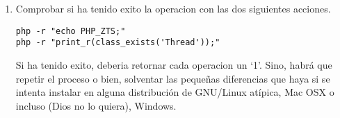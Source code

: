 \documentclass{article}
\begin{document}
\begin{enumerate}
    \item Comprobar si ha tenido exito la operacion con las dos siguientes acciones.
    \begin{lstlisting}[frame=single]
php -r "echo PHP_ZTS;"
php -r "print_r(class_exists('Thread'));"
    \end{lstlisting}
    Si ha tenido exito, deberia retornar cada operacion un `1'. Sino,
    habrá que repetir el proceso o bien, solventar las pequeñas diferencias
    que haya si se intenta instalar en alguna distribución de GNU/Linux
    atípica, Mac OSX o incluso (Dios no lo quiera), Windows.
\end{enumerate}
\end{document}
